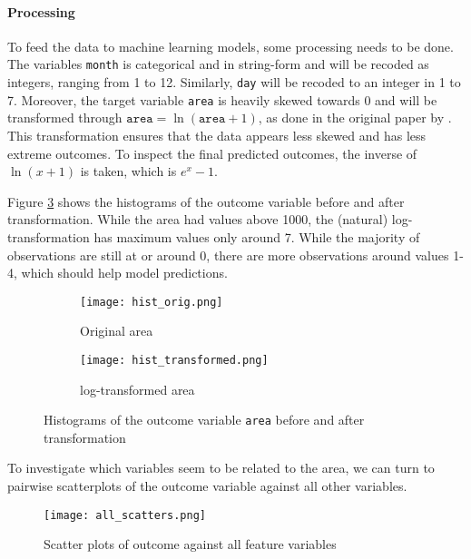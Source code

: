 \documentclass{article}
\begin{document}
\paragraph{Processing} To feed the data to machine learning models, some processing needs to be done. The variables \texttt{month} is categorical and in string-form and will be recoded as integers, ranging from 1 to 12. Similarly, \texttt{day} will be recoded to an integer in 1 to 7. Moreover, the target variable \texttt{area} is heavily skewed towards 0 and will be transformed through $\texttt{area} = \ln(\texttt{area} + 1)$, as done in the original paper by \cite{origpaper}. This transformation ensures that the data appears less skewed and has less extreme outcomes. To inspect the final predicted outcomes, the inverse of $\ln(x+1)$ is taken, which is $e^{x} - 1$.

Figure \ref{fig:hist_area} shows the histograms of the outcome variable before and after transformation. While the area had values above 1000, the (natural) log-transformation has maximum values only around 7. While the majority of observations are still at or around 0, there are more observations around values 1-4, which should help model predictions.

\begin{figure}[!ht]
\centering 
\begin{subfigure}{0.48\textwidth} 
    \centering 
    \texttt{[image: hist\_orig.png]} 
    \caption{Original area} 
    \label{fig:hist_orig} 
\end{subfigure} 
\begin{subfigure}{0.48\textwidth} 
    \centering
    \texttt{[image: hist\_transformed.png]} 
    \caption{log-transformed area} 
    \label{fig:hist_transformed} 
\end{subfigure}
\caption{Histograms of the outcome variable \texttt{area} before and after transformation}
\label{fig:hist_area}
\end{figure}

To investigate which variables seem to be related to the area, we can turn to pairwise scatterplots of the outcome variable against all other variables.

\begin{figure}[!htbp]
    \centering
    \texttt{[image: all\_scatters.png]}
    \caption{Scatter plots of outcome against all feature variables}
    \label{fig:all_scatters}
\end{figure}
\end{document}
